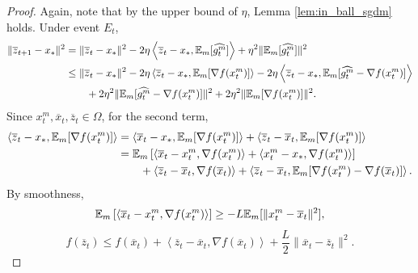 \documentclass{article} %
\numberwithin{equation}{section}
\begin{document}
\begin{proof}
    Again, note that by the upper bound of $\eta$, Lemma \ref{lem:in_ball_sgdm} holds. Under event $E_t$,
    \begin{equation}\label{eq:14}
        \begin{aligned}
            \|\overline{z}_{t+1}-x_*\|^2
            &= \|\overline{z}_t-x_*\|^2 - 2\eta \left\langle\overline{z}_t-x_*, \mathbb{E}_m [\widehat{g_t^m}]\right\rangle + \eta^2\|\mathbb{E}_m [\widehat{g_t^m}]\|^2 \\
            &\leq \|\overline{z}_t-x_*\|^2 - 2\eta \left\langle\overline{z}_t-x_*, \mathbb{E}_m [\nabla f(x_t^m)]\right\rangle - 2\eta \left\langle\overline{z}_t-x_*, \mathbb{E}_m [\widehat{g_t^m}-\nabla f(x_t^m)]\right\rangle \\
            &\qquad + 2\eta^2\|\mathbb{E}_m [\widehat{g_t^m}-\nabla f(x_t^m)]\|^2 + 2\eta^2\|\mathbb{E}_m [\nabla f(x_t^m)]\|^2.
        \end{aligned}
    \end{equation}
    Since $x_t^m, \overline{x}_t, \overline{z}_t\in \Omega$, for the second term,
    \begin{equation}
        \begin{aligned}
            \left\langle\overline{z}_t-x_*, \mathbb{E}_m [\nabla f(x_t^m)]\right\rangle 
            &= \left\langle\overline{x}_t-x_*, \mathbb{E}_m [\nabla f(x_t^m)]\right\rangle + \left\langle\overline{z}_t-\overline{x}_t, \mathbb{E}_m [\nabla f(x_t^m)]\right\rangle \\
            &= \mathbb{E}_m \left[\left\langle\overline{x}_t-x_t^m, \nabla f(x_t^m)\right\rangle+\left\langle x_t^m-x_*, \nabla f(x_t^m)\right\rangle\right] \\
            &\qquad + \left\langle\overline{z}_t-\overline{x}_t, \nabla f(\overline{x}_t)\right\rangle + \left\langle\overline{z}_t-\overline{x}_t, \mathbb{E}_m [\nabla f(x_t^m)-\nabla f(\overline{x}_t)]\right\rangle.
        \end{aligned}
    \end{equation}
    By smoothness,
    \begin{equation}\label{eq:11}
        \mathbb{E}_m \left[\left\langle\overline{x}_t-x_t^m, \nabla f(x_t^m)\right\rangle\right] \geq -L\mathbb{E}_m [\|x_t^m-\overline{x}_t\|^2],
    \end{equation}
    \begin{equation}\label{eq:12}
        f(\overline{z}_t) \leq f(\overline{x}_t)+\left\langle\overline{z}_t-\overline{x}_t, \nabla f(\overline{x}_t)\right\rangle+\frac{L}{2}\|\overline{x}_t-\overline{z}_t\|^2.

\end{equation}
\end{proof}
\end{document}
